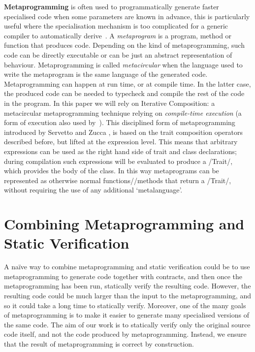 \textbf{Metaprogramming} is often used to programmatically generate faster specialised code when some parameters are known in advance, this is particularly useful where the specialisation mechanism is too complicated for a generic compiler to automatically derive~\cite{Ofenbeck:2017:SGP:3136040.3136060}.
A \emph{metaprogram} is a program, method or function 
that produces code. Depending on the kind of metaprogramming, such code can be directly executable or can be just an abstract representation of behaviour.
Metaprogramming is called \emph{metacircular} when the language used to write the metaprogram is the same language of the generated code.
Metaprogramming can happen at run time, or at compile time. In the latter case, the produced code can be needed to typecheck and compile the rest of the code in the program.
In this paper we will rely on 
Iterative Composition: 
a metacircular metaprogramming technique relying on \emph{compile-time execution} (a form of execution also used by~\cite{sheard2002template}).
This disciplined form of metaprogramming introduced by Servetto and Zucca \cite{servetto2014meta}, is based on the trait composition operators described before, but lifted at the expression level.
This means that arbitrary expressions can be used as the right hand side of trait and class declarations; during compilation such expressions will be evaluated to produce a /Trait/, which provides the body of the class. In this way metaprograms can be represented as otherwise normal functions//methods that return a /Trait/, without requiring the use of any additional `metalanguage'.

\section{Combining Metaprogramming and Static Verification}

A na\"ive way to combine metaprogramming and static verification could be to use metaprogramming to generate code together with contracts, and then once the metaprogramming has been run,
statically verify the resulting code. 
However, the resulting code could be much larger than the input to the metaprogramming, and so it could take a long time to statically verify.
Moreover, one of the many goals of metaprogramming is to make it easier to generate many specialised versions of the same  code.
The aim of our work is to statically verify only the original source code itself, and not the code produced by metaprogramming.
Instead, we
ensure that the result of metaprogramming is correct by construction.

